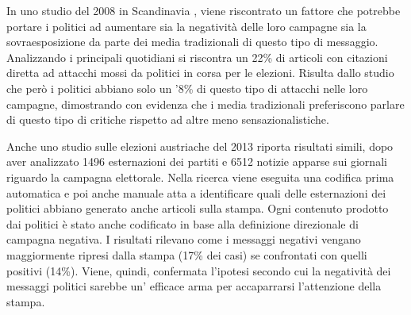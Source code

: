 
In uno studio del 2008 in Scandinavia \citep{hansen2008}, viene riscontrato un fattore che potrebbe portare i politici ad aumentare sia la negatività delle loro campagne sia la sovraesposizione da parte dei media tradizionali di questo tipo di messaggio. Analizzando i principali quotidiani si riscontra un 22\% di articoli con citazioni diretta ad attacchi mossi da politici in corsa per le elezioni. Risulta dallo studio che però i politici abbiano solo un '8\% di questo tipo di attacchi nelle loro campagne, dimostrando con evidenza che i media tradizionali preferiscono parlare di questo tipo di critiche rispetto ad altre meno sensazionalistiche.

Anche uno studio sulle elezioni austriache del 2013 \citep{haselmayer2019} riporta risultati simili, dopo aver analizzato 1496 esternazioni dei partiti e 6512 notizie apparse sui giornali riguardo la campagna elettorale. Nella ricerca viene eseguita una codifica prima automatica e poi anche manuale atta a identificare quali delle esternazioni dei politici abbiano generato anche articoli sulla stampa. Ogni contenuto prodotto dai politici è stato anche codificato in base alla definizione direzionale di campagna negativa. I risultati rilevano come i messaggi negativi vengano maggiormente ripresi dalla stampa (17\% dei casi) se confrontati con quelli positivi (14\%). Viene, quindi, confermata l'ipotesi  secondo cui la negatività dei messaggi politici sarebbe un' efficace arma per accaparrarsi l'attenzione della stampa.


